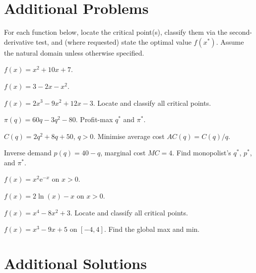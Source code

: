 \section{Additional Problems}

For each function below, locate the critical point(s), classify them via
the second-derivative test, and (where requested) state the optimal value
$f(x^*)$. Assume the natural domain unless otherwise specified.

\begin{problems}
    \item $f(x) = x^2 + 10 x + 7$.
    \item $f(x) = 3 - 2 x - x^2$.
    \item $f(x) = 2 x^3 - 9 x^2 + 12 x - 3$. Locate and classify all
          critical points.
    \item $\pi(q) = 60 q - 3 q^2 - 80$. Profit-max $q^*$ and $\pi^*$.
    \item $C(q) = 2 q^2 + 8 q + 50$, $q > 0$. Minimise average cost
          $AC(q) = C(q)/q$.
    \item Inverse demand $p(q) = 40 - q$, marginal cost $MC = 4$. Find
          monopolist's $q^*$, $p^*$, and $\pi^*$.
    \item $f(x) = x^2 \mathrm{e}^{-x}$ on $x > 0$.
    \item $f(x) = 2 \ln(x) - x$ on $x > 0$.
    \item $f(x) = x^4 - 8 x^2 + 3$. Locate and classify all critical
          points.
    \item $f(x) = x^3 - 9 x + 5$ on $[-4, 4]$. Find the global max and
          min.
\end{problems}

\section{Additional Solutions}


